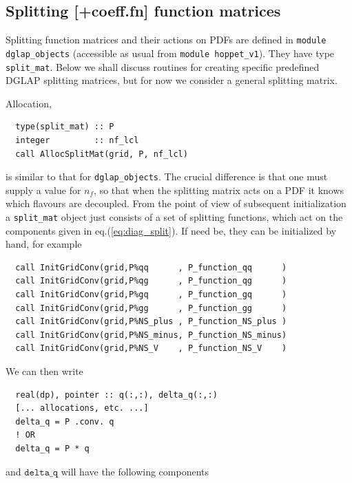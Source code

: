 \documentclass[12pt]{article}
\newcommand{\comment}[1]{\textbf{[#1]}}
\newcommand{\ttt}[1]{\texttt{#1}}
\begin{document}
\subsection{Splitting \comment{+coeff.fn} function matrices}
\label{sec:splitt-funct-matr}

Splitting function matrices and their actions on PDFs are defined in
\ttt{module dglap\_objects} (accessible as usual from \ttt{module
  hoppet\_v1}). They have type \ttt{split\_mat}. Below we shall discuss
routines for creating specific predefined DGLAP splitting matrices,
but for now we consider a general splitting matrix.

Allocation,
\begin{verbatim}
  type(split_mat) :: P
  integer         :: nf_lcl
  call AllocSplitMat(grid, P, nf_lcl)
\end{verbatim}
is similar to that for \ttt{dglap\_objects}. The crucial difference is
that one must supply a value for $n_f$, so that when the splitting
matrix acts on a PDF it knows which flavours are decoupled. From the
point of view of subsequent initialization a \ttt{split\_mat} object
just consists of a set of splitting functions, which act on the
components given in eq.(\ref{eq:diag_split}). If need be, they can be
initialized by hand, for example
\begin{verbatim}
  call InitGridConv(grid,P%qq      , P_function_qq      )
  call InitGridConv(grid,P%qg      , P_function_qg      )
  call InitGridConv(grid,P%gq      , P_function_gq      )
  call InitGridConv(grid,P%gg      , P_function_gg      )
  call InitGridConv(grid,P%NS_plus , P_function_NS_plus )
  call InitGridConv(grid,P%NS_minus, P_function_NS_minus)
  call InitGridConv(grid,P%NS_V    , P_function_NS_V    )
\end{verbatim}
We can then write
\begin{verbatim}
  real(dp), pointer :: q(:,:), delta_q(:,:)
  [... allocations, etc. ...]
  delta_q = P .conv. q
  ! OR
  delta_q = P * q
\end{verbatim}
and $\ttt{delta\_q}$ will have the following components
\end{document}
